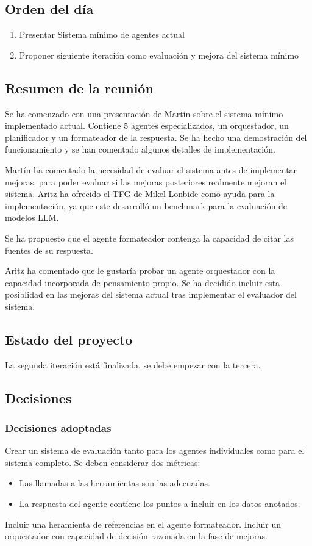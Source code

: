 \subsection{Orden del día}
\begin{enumerate}
    \item Presentar Sistema mínimo de agentes actual
    \item Proponer siguiente iteración como evaluación y mejora del sistema mínimo
\end{enumerate}

\subsection{Resumen de la reunión}
Se ha comenzado con una presentación de Martín sobre el sistema mínimo implementado actual. Contiene 5 agentes especializados, un orquestador, un planificador y un formateador de la respuesta. Se ha hecho una demostración del funcionamiento y se han comentado algunos detalles de implementación. 

Martín ha comentado la necesidad de evaluar el sistema antes de implementar mejoras, para poder evaluar si las mejoras posteriores realmente mejoran el sistema. Aritz ha ofrecido el TFG de Mikel Lonbide como ayuda para la implementación, ya que este desarrolló un benchmark para la evaluación de modelos LLM.

Se ha propuesto que el agente formateador contenga la capacidad de citar las fuentes de su respuesta. 

Aritz ha comentado que le gustaría probar un agente orquestador con la capacidad incorporada de pensamiento propio. Se ha decidido incluir esta posiblidad en las mejoras del sistema actual tras implementar el evaluador del sistema.

\subsection{Estado del proyecto}
La segunda iteración está finalizada, se debe empezar con la tercera.

\subsection{Decisiones}
\subsubsection{Decisiones adoptadas}
Crear un sistema de evaluación tanto para los agentes individuales como para el sistema completo. Se deben considerar dos métricas:
\begin{itemize}
    \item Las llamadas a las herramientas son las adecuadas.
    \item La respuesta del agente contiene los puntos a incluir en los datos anotados.
\end{itemize}
Incluir una heramienta de referencias en el agente formateador. 
Incluir un orquestador con capacidad de decisión razonada en la fase de mejoras.

